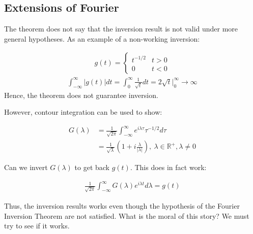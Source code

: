 \documentclass{article}
\theoremstyle{definition}
\def\R{\mathbb{R}}
\begin{document}
\subsection{Extensions of Fourier}
The theorem does not say that the inversion result is not valid under more general hypotheses. As an example of a non-working inversion:

\begin{align*}
g(t) = \begin{cases}
t^{-1/2} &t > 0 \\ 
0 & t < 0
\end{cases}
\end{align*}
\begin{align*}
\int_{-\infty}^{\infty} \left|g(t)\right| dt = \int_{0}^{\infty} \frac{1}{\sqrt{t}} dt = 2 \sqrt{t} |_0^\infty \to \infty 
\end{align*}
Hence, the theorem does not guarantee inversion.

However, contour integration can be used to show:

\begin{align*}
G(\lambda) &= \frac{1}{\sqrt{2 \pi }} \int_{-\infty}^{\infty} e^{i \lambda \tau } \tau^{-1/2} d\tau \\
 &=  \frac{1}{\sqrt{\lambda}} \left(1 + i \frac{\lambda}{|\lambda|}\right),\ \lambda \in \R^+, \lambda \neq 0
\end{align*}

Can we invert $G(\lambda)$ to get back $g(t)$. This does in fact work:

\begin{align*}
\frac{1}{\sqrt{2\pi}}\int_{-\infty}^{\infty} G(\lambda) e^{i\lambda t} d\lambda = g(t)
\end{align*}

Thus, the inversion results works even though the hypothesis of the Fourier Inversion Theorem are not satisfied. What is the moral of this story? We must try to see if it works.
\end{document}
